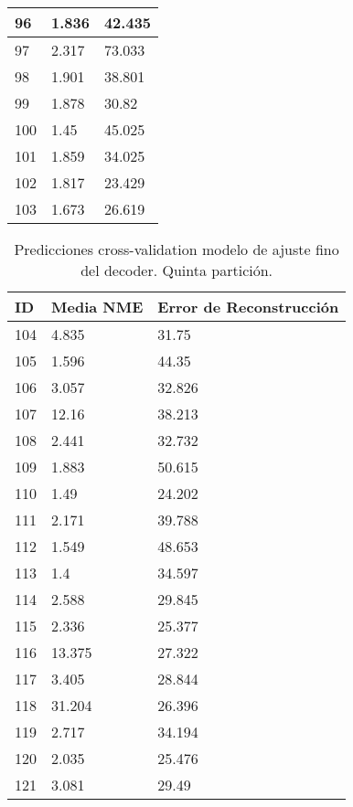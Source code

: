 \begin{table}[!ht]
\begin{tabular}{|l|l|l|}
        96 & 1.836 & 42.435 \\ \hline
        97 & 2.317 & 73.033 \\ \hline
        98 & 1.901 & 38.801 \\ \hline
        99 & 1.878 & 30.82 \\ \hline
        100 & 1.45 & 45.025 \\ \hline
        101 & 1.859 & 34.025 \\ \hline
        102 & 1.817 & 23.429 \\ \hline
        103 & 1.673 & 26.619 \\ \hline
    \end{tabular}
\end{table}

\begin{table}[!ht]
    \centering
    \caption{Predicciones cross-validation modelo de ajuste fino del  decoder. Quinta partición.}
    \begin{tabular}{|l|l|l|}
    \hline
    \cellcolor{gray!25}\textbf{ID} & \cellcolor{gray!25}\textbf{Media NME} & \cellcolor{gray!25}\textbf{Error de Reconstrucción} \\ \hline
        104 & 4.835 & 31.75 \\ \hline
        105 & 1.596 & 44.35 \\ \hline
        106 & 3.057 & 32.826 \\ \hline
        107 & 12.16 & 38.213 \\ \hline
        108 & 2.441 & 32.732 \\ \hline
        109 & 1.883 & 50.615 \\ \hline
        110 & 1.49 & 24.202 \\ \hline
        111 & 2.171 & 39.788 \\ \hline
        112 & 1.549 & 48.653 \\ \hline
        113 & 1.4 & 34.597 \\ \hline
        114 & 2.588 & 29.845 \\ \hline
        115 & 2.336 & 25.377 \\ \hline
        116 & 13.375 & 27.322 \\ \hline
        117 & 3.405 & 28.844 \\ \hline
        118 & 31.204 & 26.396 \\ \hline
        119 & 2.717 & 34.194 \\ \hline
        120 & 2.035 & 25.476 \\ \hline
        121 & 3.081 & 29.49 \\ \hline

\end{tabular}
\end{table}
